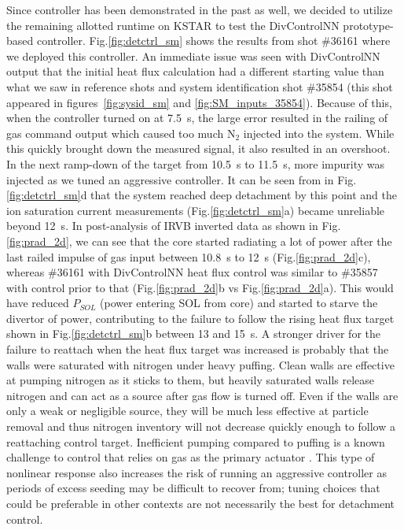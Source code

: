 Since \Afrac{} controller has been demonstrated in the past as well, we decided to utilize the remaining allotted runtime on KSTAR to test the DivControlNN prototype-based controller.
Fig.\ref{fig:detctrl_sm} shows the results from shot \#36161 where we deployed this controller.
An immediate issue was seen with DivControlNN output that the initial heat flux calculation had a different starting value than what we saw in reference shots and system identification shot \#35854 (this shot appeared in figures~\ref{fig:sysid_sm} and \ref{fig:SM_inputs_35854}).
Because of this, when the controller turned on at 7.5~s, the large error resulted in the railing of gas command output which caused too much N$_2$ injected into the system.
While this quickly brought down the measured signal, it also resulted in an overshoot.
In the next ramp-down of the target from 10.5~s to 11.5~s, more impurity was injected as we tuned an aggressive controller.
It can be seen from \Afrac{} in Fig.\ref{fig:detctrl_sm}d that the system reached deep detachment by this point and the ion saturation current measurements (Fig.\ref{fig:detctrl_sm}a) became unreliable beyond 12~s.
In post-analysis of IRVB inverted data as shown in Fig.\ref{fig:prad_2d}, we can see that the core started radiating a lot of power after the last railed impulse of gas input between 10.8~s to 12~s (Fig.\ref{fig:prad_2d}c), whereas \#36161 with DivControlNN heat flux control was similar to \#35857 with \Afrac{} control prior to that (Fig.\ref{fig:prad_2d}b vs Fig.\ref{fig:prad_2d}a).
This would have reduced $P_{SOL}$ (power entering SOL from core) and started to starve the divertor of power, contributing to the failure to follow the rising heat flux target shown in Fig.\ref{fig:detctrl_sm}b between 13 and 15~s.
A stronger driver for the failure to reattach when the heat flux target was increased is probably that the walls were saturated with nitrogen under heavy puffing.
Clean walls are effective at pumping nitrogen as it sticks to them, but heavily saturated walls release nitrogen and can act as a source after gas flow is turned off.
Even if the walls are only a weak or negligible source, they will be much less effective at particle removal and thus nitrogen inventory will not decrease quickly enough to follow a reattaching control target.
Inefficient pumping compared to puffing is a known challenge to control that relies on gas as the primary actuator \cite{Eldon_2017_NF,eldon_2025_ppcf}.
This type of nonlinear response also increases the risk of running an aggressive controller as periods of excess seeding may be difficult to recover from; tuning choices that could be preferable in other contexts are not necessarily the best for detachment control.
